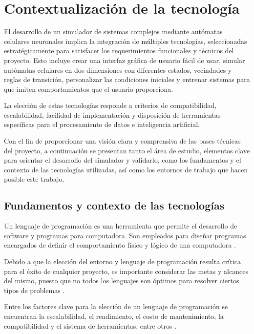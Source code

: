 \section{Contextualización de la tecnología}

El desarrollo de un simulador de sistemas complejos mediante autómatas celulares neuronales implica la integración de múltiples tecnologías, seleccionadas estratégicamente para satisfacer los requerimientos funcionales y técnicos del proyecto. Esto incluye crear una interfaz gráfica de usuario fácil de usar, simular autómatas celulares en dos dimensiones con diferentes estados, vecindades y reglas de transición, personalizar las condiciones iniciales y entrenar sistemas para que imiten comportamientos que el usuario proporciona.

La elección de estas tecnologías responde a criterios de compatibilidad, escalabilidad, facilidad de implementación y disposición de herramientas específicas para el procesamiento de datos e inteligencia artificial. 

Con el fin de proporcionar una visión clara y comprensiva de las bases técnicas del proyecto, a continuación se presentan tanto el área de estudio, elementos clave para orientar el desarrollo del simulador y validarlo, como los fundamentos y el contexto de las tecnologías utilizadas, así como los entornos de trabajo que hacen posible este trabajo. 

\subsection{Fundamentos y contexto de las tecnologías}

Un lenguaje de programación es una herramienta que permite el desarrollo de software y programas para computadora. Son empleados para diseñar programas encargados de definir el comportamiento físico y lógico de una computadora \cite{uapaLenguajes}.

Debido a que la elección del entorno y lenguaje de programación resulta crítica para el éxito de cualquier proyecto, es importante considerar las metas y alcances del mismo, puesto que no todos los lenguajes son óptimos para resolver ciertos tipos de problemas \cite{clickpandaEntorno}.

Entre los factores clave para la elección de un lenguaje de programación se encuentran la escalabilidad, el rendimiento, el costo de mantenimiento, la compatibilidad y el sistema de herramientas, entre otros \cite{clickpandaEntorno}.

